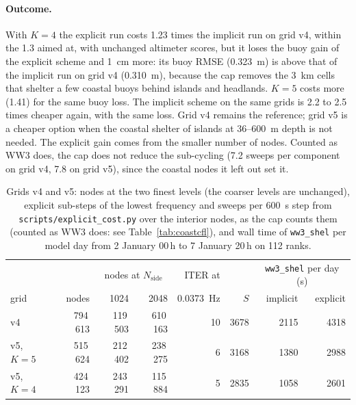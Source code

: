 \documentclass[11pt,a4paper]{article}
\newcommand{\nside}{N_{\mathrm{side}}}
\begin{document}
\paragraph{Outcome.} With $K=4$ the explicit run costs 1.23 times the
implicit run on grid v4, within the 1.3 aimed at, with unchanged
altimeter scores, but it loses the buoy gain of the explicit scheme and
\SI{1}{cm} more: its buoy RMSE (\SI{0.323}{m}) is above that of the
implicit run on grid v4 (\SI{0.310}{m}), because the cap removes the
\SI{3}{km} cells that shelter a few coastal buoys behind islands and
headlands. $K=5$ costs more (1.41) for the same buoy loss. The implicit
scheme on the same grids is 2.2 to 2.5 times cheaper again, with the same
loss.
Grid v4 remains the reference; grid v5 is a cheaper option when the
coastal shelter of islands at 36--\SI{600}{m} depth is not needed. The
explicit gain comes from the smaller number of nodes. Counted as WW3 does,
the cap does not reduce the sub-cycling (7.2 sweeps per component on grid
v4, 7.8 on grid v5), since the coastal nodes it left out set it.

\begin{table}[H]
\centering\small
\begin{tabular}{lrrrrrrr}
\toprule
 & & \multicolumn{2}{c}{nodes at $\nside$} & ITER at & & \multicolumn{2}{c}{\texttt{ww3\_shel} per day (s)} \\
grid & nodes & 1024 & 2048 & \SI{0.0373}{Hz} & $S$ & implicit & explicit \\
\midrule
v4         & 794\,613 & 119\,503 & 610\,163 & 10 & 3678 & 2115 & 4318 \\
v5, $K=5$  & 515\,624 & 212\,402 & 238\,275 &  6 & 3168 & 1380 & 2988 \\
v5, $K=4$  & 424\,123 & 243\,291 & 115\,884 &  5 & 2835 & 1058 & 2601 \\
\bottomrule
\end{tabular}
\caption{Grids v4 and v5: nodes at the two finest levels (the coarser
levels are unchanged), explicit sub-steps of the lowest frequency and
sweeps per \SI{600}{s} step from \texttt{scripts/explicit\_cost.py} over
the interior nodes, as the cap counts them (counted as WW3 does: see
Table~\ref{tab:coastcfl}), and
wall time of \texttt{ww3\_shel} per model day from 2 January 00\,h to 7
January 20\,h on 112 ranks.}
\label{tab:v5}
\end{table}
\end{document}
